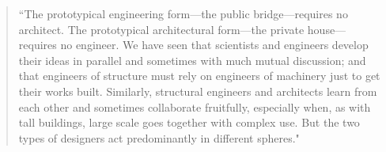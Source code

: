 \begin{quote}
  ``The prototypical engineering form---the public bridge---requires no architect. The prototypical architectural form---the private house--- requires no engineer. We have seen that scientists and engineers develop their ideas in parallel and sometimes with much mutual discussion; and that engineers of structure must rely on engineers of machinery just to get their works built. Similarly, structural engineers and architects learn from each other and sometimes collaborate fruitfully, especially when, as with tall buildings, large scale goes together with complex use. But the two types of designers act predominantly in different spheres." \cite[p14]{TOWERANDBRIDGE}
\end{quote}






